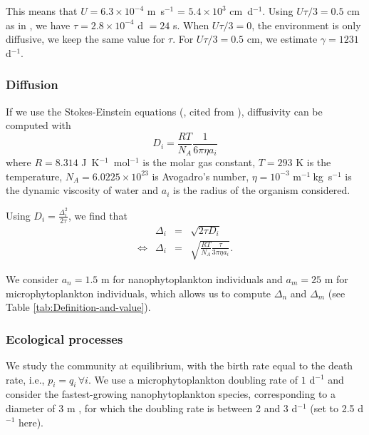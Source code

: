 \documentclass[12pt,english]{article}
\begin{document}
This means that $U=6.3\times10^{-4}$ m~s$^{-1}$ = $5.4\times10^{3}$
cm~d$^{-1}$. Using $U\tau/3=0.5$ cm as in \citet{young_reproductive_2001},
we have $\tau=2.8\times10^{-4}$ d $=24$ s. When $U\tau/3=0$, the
environment is only diffusive, we keep the same value for $\tau$.
For $U\tau/3=0.5$ cm, we estimate $\gamma=1231$ d$^{-1}$.

\subsubsection*{Diffusion}

If we use the Stokes-Einstein equations (\citealp{einstein1905molekularkinetischen},
cited from \citealp{dusenbery_2009}), diffusivity can be computed
with 
\begin{equation}
D_{i}=\frac{RT}{N_{A}}\frac{1}{6\pi\eta a_{i}}
\end{equation}
where $R=8.314$ J~K$^{-1}$~mol$^{-1}$ is the molar gas constant,
$T=293$ K is the temperature, $N_{A}=6.0225\times10^{23}$ is Avogadro's
number, $\eta=10^{-3}$ m$^{-1}~$kg~s$^{-1}$ is the dynamic viscosity
of water and $a_{i}$ is the radius of the organism considered.

Using $D_{i}=\frac{\Delta_{i}^{2}}{2\tau}$, we find that 
\begin{equation}
\begin{array}{cccc}
 & \Delta_{i} & = & \sqrt{2\tau D_{i}}\\
\Leftrightarrow & \Delta_{i} & = & \sqrt{\frac{RT}{N_{A}}\frac{\tau}{3\pi\eta a_{i}}}.
\end{array}
\end{equation}

We consider $a_{n}=1.5$ \textmu m for nanophytoplankton individuals
and $a_{m}=25$ \textmu m for microphytoplankton individuals, which
allows us to compute $\Delta_{n}$ and $\Delta_{m}$ (see Table \ref{tab:Definition-and-value}).

\subsubsection*{Ecological processes}

We study the community at equilibrium, with the birth rate equal to
the death rate, i.e., $p_{i}=q_{i}\,\forall i$. We use a microphytoplankton
doubling rate of $1$ d$^{-1}$ \citep{bissinger_predicting_2008}
and consider the fastest-growing nanophytoplankton species, corresponding
to a diameter of 3 \textmu m \citep{bec_growth_2008}, for which the
doubling rate is between 2 and 3 d$^{-1}$ (set to 2.5 d$^{-1}$ here).
\end{document}
